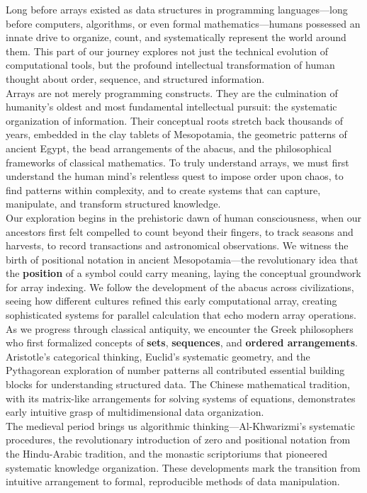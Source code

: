 \documentclass[12pt, oneside, openany]{book}
\begin{document}
Long before arrays existed as data structures in programming languages—long before computers, algorithms, or even formal mathematics—humans possessed an innate drive to organize, count, and systematically represent the world around them. This part of our journey explores not just the technical evolution of computational tools, but the profound intellectual transformation of human thought about order, sequence, and structured information.\\
Arrays are not merely programming constructs. They are the culmination of humanity's oldest and most fundamental intellectual pursuit: the systematic organization of information. Their conceptual roots stretch back thousands of years, embedded in the clay tablets of Mesopotamia, the geometric patterns of ancient Egypt, the bead arrangements of the abacus, and the philosophical frameworks of classical mathematics. To truly understand arrays, we must first understand the human mind's relentless quest to impose order upon chaos, to find patterns within complexity, and to create systems that can capture, manipulate, and transform structured knowledge.\\
Our exploration begins in the prehistoric dawn of human consciousness, when our ancestors first felt compelled to count beyond their fingers, to track seasons and harvests, to record transactions and astronomical observations. We witness the birth of positional notation in ancient Mesopotamia—the revolutionary idea that the \textbf{position} of a symbol could carry meaning, laying the conceptual groundwork for array indexing. We follow the development of the abacus across civilizations, seeing how different cultures refined this early computational array, creating sophisticated systems for parallel calculation that echo modern array operations.\\
As we progress through classical antiquity, we encounter the Greek philosophers who first formalized concepts of \textbf{sets}, \textbf{sequences}, and \textbf{ordered arrangements}. Aristotle's categorical thinking, Euclid's systematic geometry, and the Pythagorean exploration of number patterns all contributed essential building blocks for understanding structured data. The Chinese mathematical tradition, with its matrix-like arrangements for solving systems of equations, demonstrates early intuitive grasp of multidimensional data organization.\\
The medieval period brings us algorithmic thinking—Al-Khwarizmi's systematic procedures, the revolutionary introduction of zero and positional notation from the Hindu-Arabic tradition, and the monastic scriptoriums that pioneered systematic knowledge organization. These developments mark the transition from intuitive arrangement to formal, reproducible methods of data manipulation.\\
\end{document}
